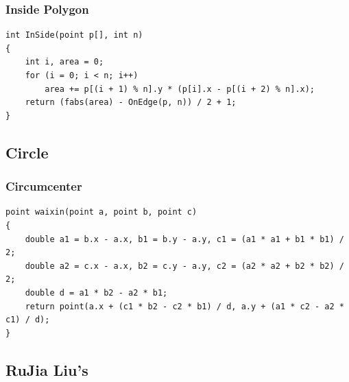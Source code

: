 \documentclass[twoside]{article}
\begin{document}
\subsubsection{Inside Polygon}
\begin{lstlisting}
int InSide(point p[], int n)
{
    int i, area = 0;
    for (i = 0; i < n; i++)
        area += p[(i + 1) % n].y * (p[i].x - p[(i + 2) % n].x);
    return (fabs(area) - OnEdge(p, n)) / 2 + 1;
}
\end{lstlisting}
\subsection{Circle}
\subsubsection{Circumcenter}
\begin{lstlisting}
point waixin(point a, point b, point c)
{
    double a1 = b.x - a.x, b1 = b.y - a.y, c1 = (a1 * a1 + b1 * b1) / 2;
    double a2 = c.x - a.x, b2 = c.y - a.y, c2 = (a2 * a2 + b2 * b2) / 2;
    double d = a1 * b2 - a2 * b1;
    return point(a.x + (c1 * b2 - c2 * b1) / d, a.y + (a1 * c2 - a2 * c1) / d);
}
\end{lstlisting}
\subsection{RuJia Liu's}
\end{document}
